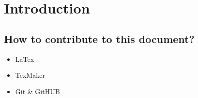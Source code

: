 \chapter{Introduction}
\label{chap:Introduction}

\section{How to contribute to this document?}
\label{sec:Contribute}

\begin{itemize}
	\item LaTex
	\item TexMaker
	\item Git \& GitHUB
\end{itemize}

